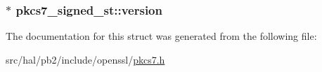 \subsubsection[{\texorpdfstring{version}{version}}]{$\ast$ pkcs7\+\_\+signed\+\_\+st\+::version}\hypertarget{structpkcs7__signed__st_afca26f9f6d8c5c95f805c3c236f04904}{}\label{structpkcs7__signed__st_afca26f9f6d8c5c95f805c3c236f04904}


The documentation for this struct was generated from the following file\+:\begin{DoxyCompactItemize}
\item 
src/hal/pb2/include/openssl/\hyperlink{pkcs7_8h}{pkcs7.\+h}\end{DoxyCompactItemize}
